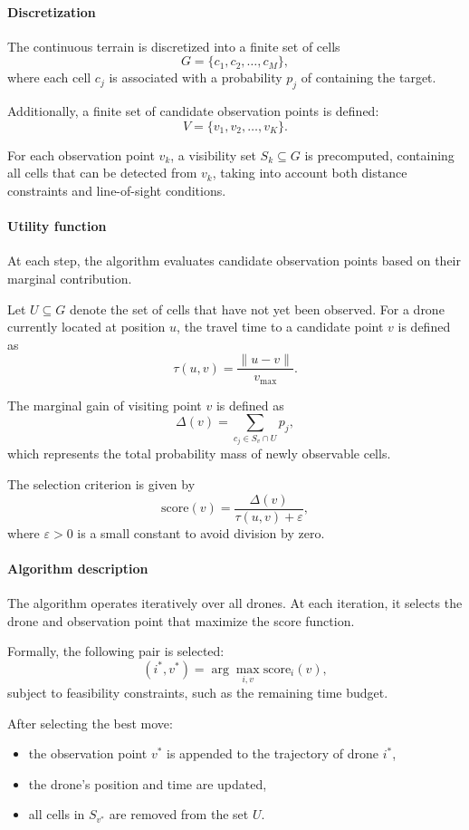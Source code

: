 \documentclass[english]{projectreport}
\begin{document}
\paragraph{Discretization}

The continuous terrain is discretized into a finite set of cells
\[
G = \{c_1, c_2, \dots, c_M\},
\]
where each cell \(c_j\) is associated with a probability \(p_j\) of containing the target.

Additionally, a finite set of candidate observation points is defined:
\[
V = \{v_1, v_2, \dots, v_K\}.
\]

For each observation point \(v_k\), a visibility set \(S_k \subseteq G\) is precomputed, containing all cells that can be detected from \(v_k\), taking into account both distance constraints and line-of-sight conditions.

\paragraph{Utility function}

At each step, the algorithm evaluates candidate observation points based on their marginal contribution.

Let \(U \subseteq G\) denote the set of cells that have not yet been observed. For a drone currently located at position \(u\), the travel time to a candidate point \(v\) is defined as
\[
\tau(u, v) = \frac{\|u - v\|}{v_{\max}}.
\]

The marginal gain of visiting point \(v\) is defined as
\[
\Delta(v) = \sum_{c_j \in S_v \cap U} p_j,
\]
which represents the total probability mass of newly observable cells.

The selection criterion is given by
\[
\mathrm{score}(v) = \frac{\Delta(v)}{\tau(u, v) + \varepsilon},
\]
where \(\varepsilon > 0\) is a small constant to avoid division by zero.

\paragraph{Algorithm description}

The algorithm operates iteratively over all drones. At each iteration, it selects the drone and observation point that maximize the score function.

Formally, the following pair is selected:
\[
(i^*, v^*) = \arg\max_{i, v} \mathrm{score}_i(v),
\]
subject to feasibility constraints, such as the remaining time budget.

After selecting the best move:
\begin{itemize}
    \item the observation point \(v^*\) is appended to the trajectory of drone \(i^*\),
    \item the drone's position and time are updated,
    \item all cells in \(S_{v^*}\) are removed from the set \(U\).
\end{itemize}
\end{document}
